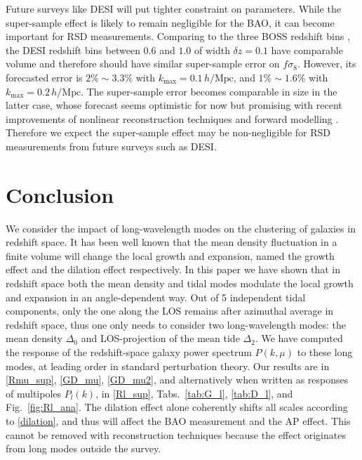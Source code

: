 \documentclass[a4paper,11pt]{article}
\newcommand{\Mpc}{\mathrm{Mpc}}
\newcommand{\hMpc}{{\,h/\Mpc}}
\begin{document}
Future surveys like DESI \cite{AghamousaEtAl16a} will put tighter constraint on
parameters.
While the super-sample effect is likely to remain negligible for the BAO, it
can become important for RSD measurements.
Comparing to the three BOSS redshift bins \cite{AlamEtAl17}, the DESI redshift
bins between $0.6$ and $1.0$ of width $\delta z=0.1$ have comparable volume and
therefore should have similar super-sample error on $f\sigma_8$.
However, its forecasted error is $2\%\sim3.3\%$ with $k_\mathrm{max}=0.1\hMpc$,
and $1\%\sim1.6\%$ with $k_\mathrm{max}=0.2\hMpc$.
The super-sample error becomes comparable in size in the latter case,
whose forecast seems optimistic for now but promising with recent
improvements of nonlinear reconstruction techniques \cite{ZhuYuEtAl16,
SchmittfullEtAl17, ShiCautunLi17} and forward modelling
\cite{SeljakEtAl17}.
Therefore we expect the super-sample effect may be non-negligible for RSD
measurements from future surveys such as DESI.



\section{Conclusion}
\label{sec:con}

We consider the impact of long-wavelength modes on the clustering of galaxies
in redshift space.
It has been well known that the mean density fluctuation in a finite volume
will change the local growth and expansion, named the growth effect and the
dilation effect respectively.
In this paper we have shown that in redshift space both the mean density and tidal modes modulate the local
growth and expansion in an angle-dependent way.
Out of 5 independent tidal components, only the one along the LOS remains after
azimuthal average in redshift space, thus one only needs to consider two
long-wavelength modes: the mean density $\Delta_0$ and LOS-projection of the
mean tide $\Delta_2$.
We have computed the response of the redshift-space galaxy power spectrum
$P(k,\mu)$ to these long modes, at leading order in standard perturbation
theory.
Our results are in \eqref{Rmu_sup}, \eqref{GD_mu}, \eqref{GD_mu2}, and alternatively
when written as responses of multipoles $P_l(k)$, in \eqref{Rl_sup},
Tabs.~\ref{tab:G_l}, \ref{tab:D_l}, and Fig.~\ref{fig:Rl_ana}.
The dilation effect alone coherently shifts all scales according to
\eqref{dilation}, and thus will affect the BAO measurement and the AP effect.
This cannot be removed with reconstruction techniques because the effect
originates from long modes outside the survey.
\end{document}

